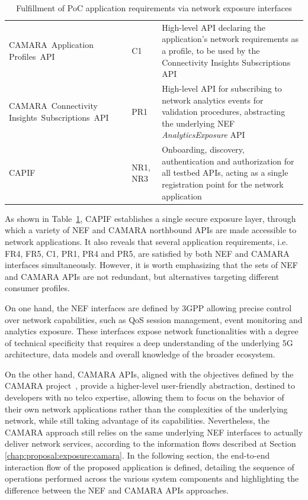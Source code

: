 \begin{table}[ht]
\begin{tabular}{p{3.9cm} p{1.4cm} p{8.1cm}}
\mbox{CAMARA Application} \mbox{Profiles \acs{API}} & C1 & High-level \acs{API} declaring the application's network requirements as a profile, to be used by the Connectivity Insights Subscriptions \acs{API} \\
\mbox{CAMARA Connectivity} \mbox{Insights Subscriptions \acs{API}} & PR1 & High-level \acs{API} for subscribing to network analytics events for validation procedures, abstracting the underlying \acs{NEF} \textit{AnalyticsExposure} \acs{API} \\
\acs{CAPIF} & NR1, NR3 & Onboarding, discovery, authentication and authorization for all testbed \acsp{API}, acting as a single registration point for the network application \\
\bottomrule
\end{tabular}
\caption{Fulfillment of \acs{PoC} application requirements via network exposure interfaces}
\label{tab:poc:api:mapping}
\end{table}

As shown in Table~\ref{tab:poc:api:mapping}, \acs{CAPIF} establishes a single secure exposure layer, through which a variety of \acs{NEF} and CAMARA northbound \acsp{API} are made accessible to network applications. It also reveals that several application requirements, i.e. FR4, FR5, C1, PR1, PR4 and PR5, are satisfied by both \acs{NEF} and CAMARA interfaces simultaneously. However, it is worth emphasizing that the sets of \acs{NEF} and CAMARA \acsp{API} are not redundant, but alternatives targeting different consumer profiles.

On one hand, the \acs{NEF} interfaces are defined by \acs{3GPP} allowing precise control over network capabilities, such as \acs{QoS} session management, event monitoring and analytics exposure. These interfaces expose network functionalities with a degree of technical specificity that requires a deep understanding of the underlying \acs{5G} architecture, data models and overall knowledge of the broader ecosystem.

On the other hand, CAMARA \acsp{API}, aligned with the objectives defined by the CAMARA project~\cite{CAMARAProject}, provide a higher-level user-friendly abstraction, destined to developers with no telco expertise, allowing them to focus on the behavior of their own network applications rather than the complexities of the underlying network, while still taking advantage of its capabilities. Nevertheless, the CAMARA approach still relies on the same underlying \acs{NEF} interfaces to actually deliver network services, according to the information flows described at Section \ref{chap:proposal:exposure:camara}. In the following section, the end-to-end interaction flow of the proposed application is defined, detailing the sequence of operations performed across the various system components and highlighting the difference between the \acs{NEF} and CAMARA \acsp{API} approaches.


